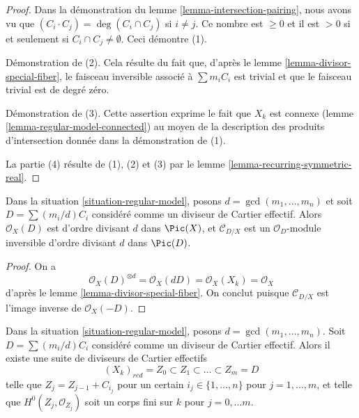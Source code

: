 \begin{proof}
Dans la démonstration du lemme \ref{lemma-intersection-pairing}, nous avons vu que
$(C_i \cdot C_j) = \deg(C_i \cap C_j)$ si $i \not = j$. Ce nombre est
$\geq 0$ et il est $> 0 $ si et seulement si $C_i \cap C_j \not = \emptyset$.
Ceci démontre (1).

\medskip\noindent
Démonstration de (2). Cela résulte du fait que, d'après le
lemme \ref{lemma-divisor-special-fiber}, le faisceau inversible associé à
$\sum m_i C_i$ est trivial et que le faisceau trivial est de degré zéro.

\medskip\noindent
Démonstration de (3). Cette assertion exprime le fait que $X_k$ est connexe
(lemme \ref{lemma-regular-model-connected})
au moyen de la description des produits d'intersection donnée dans la démonstration de (1).

\medskip\noindent
La partie (4) résulte de (1), (2) et (3) par le
lemme \ref{lemma-recurring-symmetric-real}.
\end{proof}

\begin{lemma}
\label{lemma-multiple-fibre-normal-bundle}
Dans la situation \ref{situation-regular-model}, posons $d = \gcd(m_1, \ldots, m_n)$
et soit $D = \sum (m_i/d)C_i$ considéré comme un diviseur de Cartier effectif.
Alors $\mathcal{O}_X(D)$ est d'ordre divisant $d$ dans $\Pic(X)$,
et $\mathcal{C}_{D/X}$ est un $\mathcal{O}_D$-module inversible
d'ordre divisant $d$ dans $\Pic(D)$.
\end{lemma}

\begin{proof}
On a
$$
\mathcal{O}_X(D)^{\otimes d} = \mathcal{O}_X(dD) =
\mathcal{O}_X(X_k) = \mathcal{O}_X
$$
d'après le lemme \ref{lemma-divisor-special-fiber}.
On conclut puisque $\mathcal{C}_{D/X}$ est l'image inverse de
$\mathcal{O}_X(-D)$.
\end{proof}

\begin{lemma}
\label{lemma-regular-model-field}
\begin{reference}
\cite[Lemma 2.6]{Artin-Winters}
\end{reference}
Dans la situation \ref{situation-regular-model}, posons $d = \gcd(m_1, \ldots, m_n)$.
Soit $D = \sum (m_i/d) C_i$ considéré comme un diviseur de Cartier effectif. Alors il existe
une suite de diviseurs de Cartier effectifs
$$
(X_k)_{red} = Z_0 \subset Z_1 \subset \ldots \subset Z_m = D
$$
telle que $Z_j = Z_{j - 1} + C_{i_j}$ pour un certain $i_j \in \{1, \ldots, n\}$
pour $j = 1, \ldots, m$, et telle que $H^0(Z_j, \mathcal{O}_{Z_j})$
soit un corps fini sur $k$ pour $j = 0, \ldots m$.
\end{lemma}


